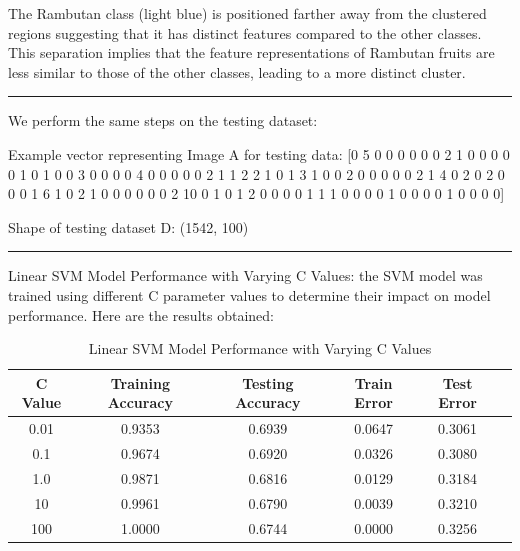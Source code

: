 \documentclass[a4paper,10 pt]{article}
\begin{document}
The Rambutan class (light blue) is positioned farther away from the clustered regions suggesting that it has distinct features compared to the other classes. This separation implies that the feature representations of Rambutan fruits are less similar to those of the other classes, leading to a more distinct cluster.

\vspace{12pt}

\hrule 

\vspace{12pt}

We perform the same steps on the testing dataset: 

\vspace{12pt}
  Example vector representing Image A for testing data: [0 5 0 0 0 0 0 0 2 1 0 0 0 0 0 1 0 1 0 0 3 0 0 0 0 4 0 0 0 0 0 2 1 1 2 2 1 0 1 3 1 0 0 2 0 0 0 0 0 2 1 4 0 2 0 2 0 0 0 1 6 1 0 2 1 0 0 0 0 0 0 2 10 0 1 0 1 2 0 0 0 0 1 1 1 0 0 0 0 1 0 0 0 0 1 0 0 0 0]
  \vspace{12pt}

      Shape of testing dataset D: (1542, 100)
      \vspace{12pt}

      \hrule 

      \vspace{12pt}

  
    
      Linear SVM Model Performance with Varying C Values: the SVM model was trained using different C parameter values to determine their impact on model performance. Here are the results obtained:

      \begin{table}[H]
        \centering
        \caption{Linear SVM Model Performance with Varying C Values}
        \begin{tabular}{@{}cccccc@{}}
            \toprule
            \textbf{C Value} & \textbf{Training Accuracy} & \textbf{Testing Accuracy} & \textbf{Train Error} & \textbf{Test Error} \\ 
            \midrule
             0.01 & 0.9353 & 0.6939 & 0.0647 & 0.3061 \\
              0.1 & 0.9674 & 0.6920 & 0.0326 & 0.3080 \\
              1.0 & 0.9871 & 0.6816 & 0.0129 & 0.3184 \\
             10 & 0.9961 & 0.6790 & 0.0039 & 0.3210 \\
             100 & 1.0000 & 0.6744 & 0.0000 & 0.3256 \\ 
            \bottomrule
        \end{tabular}
    \end{table}
      
\end{document}

